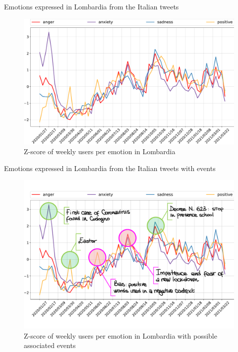 \documentclass[9pt,aspectratio=1610]{beamer}  %
\begin{document}
\begin{frame}{Emotions expressed in Lombardia from the Italian tweets}
    
    \begin{figure}[H]
    	\centering
    	\includegraphics[scale=.30]{assets/img/it_4_categories_lombardia_standardized.svg.pdf}
    	\caption{Z-score of weekly users per emotion in Lombardia}
    	\label{fig:it-4-categories-lombardia-std}
    \end{figure}

\end{frame}

\begin{frame}{Emotions expressed in Lombardia from the Italian tweets with events}
    
    \begin{figure}[H]
    	\centering
    	\includegraphics[scale=.4]{assets/img/it_4_categories_lombardia_events_and_bias.svg.pdf}
    	\vspace*{-.75cm}
    	\caption{Z-score of weekly users per emotion in Lombardia with possible associated events}
    	\label{fig:it-4-categories-lombardia-std-events-bias}
    \end{figure}

\end{frame}
\end{document}
